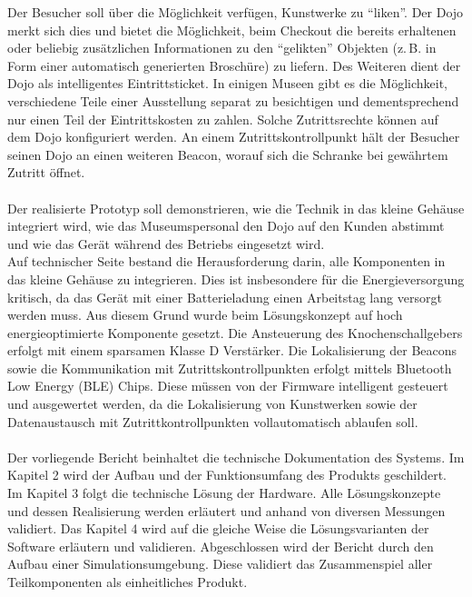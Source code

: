 Der Besucher soll über die Möglichkeit verfügen, Kunstwerke zu ``liken''. Der Dojo merkt sich dies und bietet die Möglichkeit, beim Checkout die bereits erhaltenen oder beliebig zusätzlichen Informationen zu den ``gelikten'' Objekten (z.\,B. in Form einer automatisch generierten Broschüre) zu liefern.
Des Weiteren dient der Dojo als intelligentes Eintrittsticket. In einigen Museen gibt es die Möglichkeit, verschiedene Teile einer Ausstellung separat zu besichtigen und dementsprechend nur einen Teil der Eintrittskosten zu zahlen. Solche Zutrittsrechte können auf dem Dojo konfiguriert werden. An einem Zutrittskontrollpunkt hält der Besucher seinen Dojo an einen weiteren Beacon, worauf sich die Schranke bei gewährtem Zutritt öffnet.\\\\
Der realisierte Prototyp soll demonstrieren, wie die Technik in das kleine Gehäuse integriert wird, wie das Museumspersonal den Dojo auf den Kunden abstimmt und wie das Gerät während des Betriebs eingesetzt wird.\\
Auf technischer Seite bestand die Herausforderung darin, alle Komponenten in das kleine Gehäuse zu integrieren. Dies ist insbesondere für die Energieversorgung kritisch, da das Gerät mit einer Batterieladung einen Arbeitstag lang versorgt werden muss. Aus diesem Grund wurde beim Lösungskonzept auf hoch energieoptimierte Komponente gesetzt. Die Ansteuerung des Knochenschallgebers erfolgt mit einem sparsamen Klasse D Verstärker. Die Lokalisierung der Beacons sowie die Kommunikation mit Zutrittskontrollpunkten erfolgt mittels Bluetooth Low Energy (BLE) Chips. Diese müssen von der Firmware intelligent gesteuert und ausgewertet werden, da die Lokalisierung von Kunstwerken sowie der Datenaustausch mit Zutrittkontrollpunkten vollautomatisch ablaufen soll.\\\\
Der vorliegende Bericht beinhaltet die technische Dokumentation des Systems. Im Kapitel 2 wird der Aufbau und der Funktionsumfang des Produkts geschildert. Im Kapitel 3 folgt die technische Lösung der Hardware. Alle Lösungskonzepte und dessen Realisierung werden erläutert und anhand von diversen Messungen validiert. Das Kapitel 4 wird auf die gleiche Weise die Lösungsvarianten der Software erläutern und validieren.
Abgeschlossen wird der Bericht durch den Aufbau einer Simulationsumgebung. Diese validiert das Zusammenspiel aller Teilkomponenten als einheitliches Produkt.